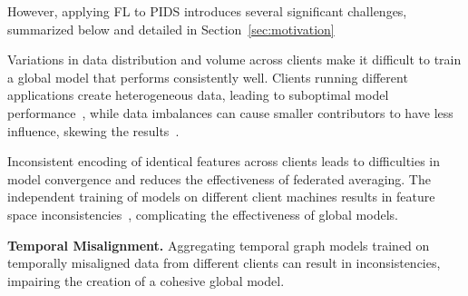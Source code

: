 However, applying FL to PIDS introduces several significant challenges, summarized below and detailed in Section~\ref{sec:motivation}

\begin{enumerate}[itemsep=0.1em, parsep=0em, topsep=0em]
   Variations in data distribution and volume across clients make it difficult to train a global model that performs consistently well. Clients running different applications create heterogeneous data, leading to suboptimal model performance~\cite{qu2022rethinking}, while data imbalances can cause smaller contributors to have less influence, skewing the results~\cite{duan2020self}.

   Inconsistent encoding of identical features across clients leads to difficulties in model convergence and reduces the effectiveness of federated averaging. The independent training of \wordvec models on different client machines results in feature space inconsistencies~\cite{zhou2023fedfa}, complicating the effectiveness of global \gnnshort models.

   {\bf Temporal Misalignment.} Aggregating temporal graph models trained on temporally misaligned data from different clients can result in inconsistencies, impairing the creation of a cohesive global model.
  
\end{enumerate}


